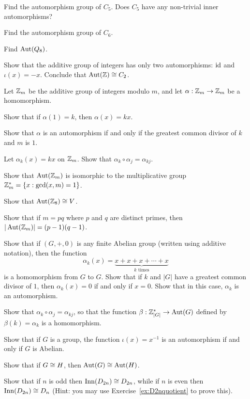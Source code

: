 \begin{exercises}
  \item Find the automorphism group of $C_{5}$.  Does $C_{5}$ have 
    any non-trivial inner automorphisms?
  
  \item Find the automorphism group of $C_{6}$.
  
  \item Find $\operatorname{Aut}(Q_{8})$.
  
  \item Show that the additive group of integers has only two
    automorphisms: $\text{id}$ and $\iota(x) = -x$.  Conclude that
    $\operatorname{Aut}(\mathbb{Z}) \cong C_{2}$.
  
  \item Let $\mathbb{Z}_{m}$ be the additive group of integers modulo $m$,
    and let $\alpha : \mathbb{Z}_{m} \to \mathbb{Z}_{m}$ be a homomorphism.
    
    Show that if $\alpha(1) = k$, then $\alpha(x) = kx$.
    
    Show that $\alpha$ is an automorphism if and only if the greatest common
    divisor of $k$ and $m$ is $1$.
    
    Let $\alpha_{k}(x) = kx$ on $\mathbb{Z}_{m}$.  Show that $\alpha_{k} \circ
    \alpha_{j} = \alpha_{kj}$.
    
    Show that $\operatorname{Aut}(\mathbb{Z}_{m})$ is isomorphic to the multiplicative
    group $\mathbb{Z}_{m}^{*} = \{x : \gcd(x,m) = 1\}$.
    
    Show that $\operatorname{Aut}(\mathbb{Z}_{8}) \cong V$.
    
    Show that if $m = pq$ where $p$ and $q$ are distinct primes, then
    $|\operatorname{Aut}(\mathbb{Z}_{m})| = (p-1)(q-1)$.
  
  \item Show that if $(G, +, 0)$ is any finite Abelian group (written using
    additive notation), then the function
    \[
      \alpha_{k}(x) = \underbrace{x + x + x + \cdots + x}_{k\text{ times}}
    \]
    is a homomorphism from $G$ to $G$.  Show that if $k$ and $|G|$ have
    a greatest common divisor of $1$, then $\alpha_{k}(x) = 0$ if and only
    if $x = 0$.  Show that in this case, $\alpha_{k}$ is an automorphism.
    
    Show that $\alpha_{k} \circ \alpha_{j} = \alpha_{kj}$, so that the
    function $\beta : \mathbb{Z}_{|G|}^{*} \to \operatorname{Aut}(G)$ defined by
    $\beta(k) = \alpha_{k}$ is a homomorphism.
    
  \item Show that if $G$ is a group, the function 
    $\iota(x) = x^{-1}$ is an automorphism if and only if $G$ is Abelian.
  
  \item Show that if $G \cong H$, then $\operatorname{Aut}(G) \cong \operatorname{Aut}(H)$.
  
  \item Show that if $n$ is odd then $\operatorname{Inn}(D_{2n}) \cong D_{2n}$, 
    while if $n$ is even then $\operatorname{Inn}(D_{2n}) \cong D_{n}$ (Hint: you 
    may use Exercise~\ref{ex:D2nquotient} to prove this).
\end{exercises}


